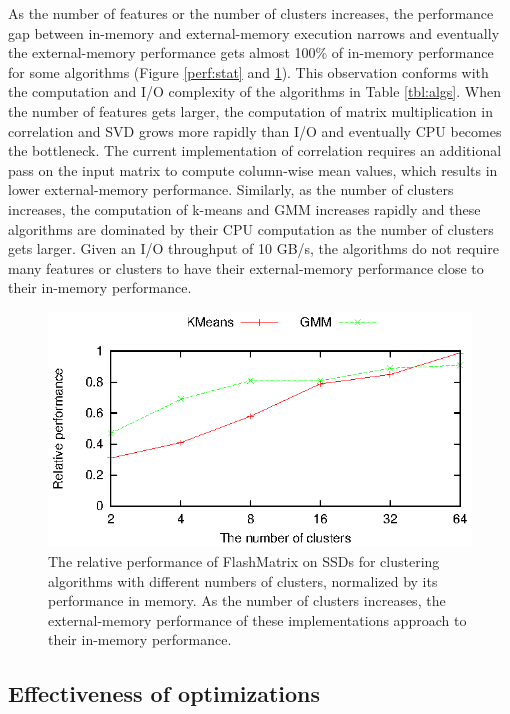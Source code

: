 As the number of features or the number of clusters increases,
the performance gap between in-memory and external-memory execution
narrows and eventually the external-memory performance gets almost 100\%
of in-memory performance for some algorithms (Figure \ref{perf:stat} and
\ref{perf:clust}).
This observation conforms with the computation and I/O complexity of
the algorithms in Table \ref{tbl:algs}. When the number of features
gets larger, the computation of matrix multiplication in
correlation and SVD grows more rapidly than I/O and eventually CPU becomes
the bottleneck. The current implementation of correlation requires an additional
pass on the input matrix to compute column-wise mean values, which results in
lower external-memory performance. Similarly, as the number of clusters
increases, the computation of k-means and GMM increases rapidly and
these algorithms are dominated by their CPU computation as the number
of clusters gets larger. Given an I/O throughput of 10 GB/s, the algorithms
do not require many features or clusters to have their external-memory
performance close to their in-memory performance.

\begin{figure}
	\begin{center}
		\footnotesize
		\includegraphics{FlashMatrix_figs/IM-vs-EM-clust.eps}
		\caption{The relative performance of FlashMatrix on SSDs for
			clustering algorithms with different numbers of clusters, normalized
			by its performance in memory. As the number of clusters increases,
			the external-memory performance of these implementations approach
			to their in-memory performance.}
		\label{perf:clust}
	\end{center}
\end{figure}

\vspace{-8pt}
\subsection{Effectiveness of optimizations}
\vspace{-4pt}

